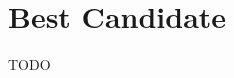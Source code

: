 \documentclass[12pt,a4paper]{article}
\begin{document}
\section{Best Candidate}
\label{s:best}

TODO

\begin{comment}
====extra things====
S4 etc.

TD-MPC2 >> DreamerV3 for continuous control (DreamerV3 better for discrete control,
    although allegedly worse now than IRIS, Diamond, TWM, etc.)
this requires to learn a world model, to then plan on

MoCap
Temporal Cycle-Consistency Learning (TCC)
in-context learning (in-context RL --ICRL)
\end{comment}


\end{document}
